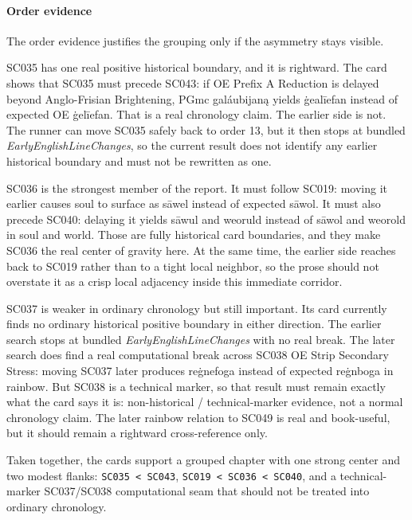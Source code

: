 \documentclass[
  british,
  a4paper,
]{article}
\begin{document}
\paragraph{Order evidence}\label{order-evidence-23}

The order evidence justifies the grouping only if the asymmetry stays
visible.

SC035 has one real positive historical boundary, and it is rightward.
The card shows that SC035 must precede SC043: if OE Prefix A Reduction
is delayed beyond Anglo-Frisian Brightening, PGmc galáubijaną yields
ġealīefan instead of expected OE ġelīefan. That is a real chronology
claim. The earlier side is not. The runner can move SC035 safely back to
order 13, but it then stops at bundled \emph{EarlyEnglishLineChanges},
so the current result does not identify any earlier historical boundary
and must not be rewritten as one.

SC036 is the strongest member of the report. It must follow SC019:
moving it earlier causes soul to surface as sāwel instead of expected
sāwol. It must also precede SC040: delaying it yields sāwul and weoruld
instead of sāwol and weorold in soul and world. Those are fully
historical card boundaries, and they make SC036 the real center of
gravity here. At the same time, the earlier side reaches back to SC019
rather than to a tight local neighbor, so the prose should not overstate
it as a crisp local adjacency inside this immediate corridor.

SC037 is weaker in ordinary chronology but still important. Its card
currently finds no ordinary historical positive boundary in either
direction. The earlier search stops at bundled
\emph{EarlyEnglishLineChanges} with no real break. The later search does
find a real computational break across SC038 OE Strip Secondary Stress:
moving SC037 later produces reġnefoga instead of expected reġnboga in
rainbow. But SC038 is a technical marker, so that result must remain
exactly what the card says it is: non-historical / technical-marker
evidence, not a normal chronology claim. The later rainbow relation to
SC049 is real and book-useful, but it should remain a rightward
cross-reference only.

Taken together, the cards support a grouped chapter with one strong
center and two modest flanks: \texttt{SC035\ \textless{}\ SC043},
\texttt{SC019\ \textless{}\ SC036\ \textless{}\ SC040}, and a
technical-marker SC037/SC038 computational seam that should not be
treated into ordinary chronology.
\end{document}
